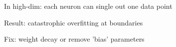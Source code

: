 \documentclass[preview]{standalone}
\begin{document}
In high-dim: each neuron can single out one data point\\Result: catastrophic overfitting at boundaries\\Fix: weight decay  or  remove 'bias' parameters\\
\end{document}

